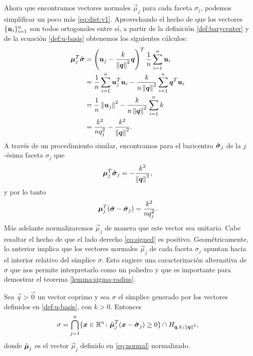Ahora que encontramos vectores normales $\vec{\mu}_j$ para cada faceta $\sigma_j$, podemos
simplificar un poco más \eqref{eq:dist:v1}. Aprovechando el hecho de que los vectores
$\lbrace \boldsymbol{u}_i \rbrace_{i=1}^{n}$ son todos ortogonales entre sí, a partir de la definición
\ref{def:barycenter} y de la ecuación \eqref{def:u-basis} obtenemos los siguientes cálculos:
\begin{align*}
	\boldsymbol{\mu}_j^T\hat{\boldsymbol{ \sigma }}
	&=
	\left(\boldsymbol{u}_j - \frac{k}{\left\lVert \boldsymbol{q} \right\rVert^2}\boldsymbol{q}\right)^T \frac{1}{n}\sum_{i=1}^{n}\boldsymbol{u}_i \\
	&=
	\frac{1}{n}\sum_{i=1}^{n}\boldsymbol{u}_j^T\boldsymbol{u}_i - \frac{k}{n\left\lVert \boldsymbol{q} \right\rVert^2}
	\sum_{i=1}^{n}\boldsymbol{q}^T\boldsymbol{u}_i \\
	&= \frac{1}{n}\left\lVert \boldsymbol{u}_j \right\rVert^2 - \frac{k}{n\left\lVert \boldsymbol{q} \right\rVert^2}\sum_{i=1}^{n}k \\
	&= \frac{k^2}{nq_j^2} - \frac{k^2}{\left\lVert \boldsymbol{q} \right\rVert^2}.
\end{align*}
A través de un procedimiento similar, encontramos para el baricentro
$\hat{\boldsymbol{ \sigma }}_j$ de la $j$-ésima faceta $\sigma_j$ que
\begin{equation}
	\label{eq:facetaux}
	\boldsymbol{\mu}_j^T\hat{\boldsymbol{ \sigma }}_j = -\frac{k^2}{\left\lVert \boldsymbol{q} \right\rVert^2},
\end{equation}
y por lo tanto
\begin{equation}
	\label{eq:signed}
	\boldsymbol{\mu}_j^T(\hat{\boldsymbol{ \sigma }} - \hat{\boldsymbol{ \sigma }}_j) = \frac{k^2}{nq_j^2}.
\end{equation}
Más adelante normalizaremos $\vec{\mu}_j$ de manera que este vector sea unitario. Cabe resaltar el
hecho de que el lado derecho \eqref{eq:signed} es positivo. Geométricamente, lo anterior implica
que los vectores normales $\vec{\mu}_j$ de cada faceta $\sigma_j$ apuntan hacia el interior relativo
del símplice $\sigma$. Esto sugiere una caracterización alternativa de $\sigma$ que nos permite
interpretarlo como un poliedro y que es importante para demostrar el teorema \ref{lemma:sigma-radius}.
\begin{lemma}
	\label{lemma:sigmachar2}
	Sea $\vec{q} > \vec{0}$ un vector coprimo y sea $\sigma$ el símplice generado por los vectores
	definidos en \eqref{def:u-basis}, con $k > 0$. Entonces
	\begin{equation}
		\label{eq:sigmachar2}
		\sigma = \bigcap_{j=1}^{n}
		\lbrace \boldsymbol{x} \in \mathbb{R}^n \colon \hat{\boldsymbol{\mu}}_j^T(\boldsymbol{x} - \hat{\boldsymbol{ \sigma }}_j) \geq 0 \rbrace
		\cap H_{\boldsymbol{\boldsymbol{q}}, k/\left\lVert \boldsymbol{\boldsymbol{q}} \right\rVert^{2}},
	\end{equation}
	donde $\hat{\boldsymbol{\mu}}_j$ es el vector $\vec{\mu}_j$ definido en \eqref{eq:normal} normalizado.
\end{lemma}
